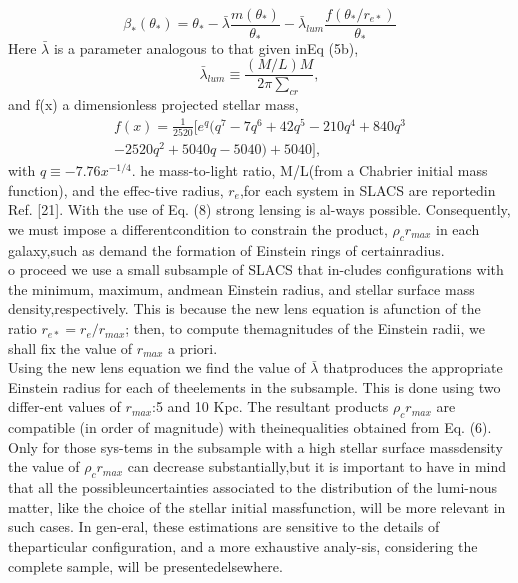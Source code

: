 \documentclass{article}\newcommand\Star[1]{#1\textsuperscript{*}}
\begin{document}
\begin{multicols}{2}
\begin{equation}\tag{8a}
	\beta_{*}(\theta_{*})=\theta_{*}-\bar{\lambda} \frac{m(\theta_{*})}{\theta_{*}}-\bar{\lambda}_{lum} \frac{f(\theta_{*}/r_{e*})}{\theta_{*}}
\end{equation}
 Here \(\bar\lambda\) is  a  parameter  analogous  to  that  given  inEq (5b),
\begin{equation}\tag{8b}
	\bar{\lambda}_{lum}\equiv \frac{(M/L)M}{2\pi\sum_{cr}}, 
\end{equation} 
and f(x) a dimensionless projected stellar mass,
\begin{multline*}\tag{8c}
	 f(x)=\frac{1}{2520}[e^{q}(q^{7}-7q^{6}+42q^{5}-210q^{4}+840q^{3} \\ -2520q^{2}+5040q-5040)+5040],
\end{multline*}
with \(q\equiv -7.76x^{-1/4}\). he  mass-to-light  ratio, M/L(from  a  Chabrier  initial  mass  function),  and  the  effec-tive radius, \(r_{e}\),for each system in SLACS are reportedin Ref. [21].  With the use of Eq.  (8) strong lensing is al-ways possible.  Consequently, we must impose a differentcondition to constrain the product, \(\rho_{c}r_{max}\) in each galaxy,such as demand the formation of Einstein rings of certainradius.\\
o proceed we use a small subsample of SLACS that in-cludes configurations with the minimum, maximum, andmean  Einstein  radius,  and  stellar  surface  mass  density,respectively.  This is because the new lens equation is afunction of the ratio \(r_{e*}=r_{e}/r_{max}\); then, to compute themagnitudes of the Einstein radii, we shall fix the value of \(r_{max}\) a priori. \\
Using the new lens equation we find the value of \(\bar{\lambda}\) thatproduces the appropriate Einstein radius for each of theelements in the subsample.  This is done using two differ-ent values of \(r_{max}\):5 and 10 Kpc.  The resultant products \(\rho_{c}r_{max}\) are compatible (in order of magnitude) with theinequalities obtained from Eq.  (6).  Only for those sys-tems in the subsample with a high stellar surface massdensity  the  value  of \(\rho_{c}r_{max}\) can  decrease  substantially,but it is important to have in mind that all the possibleuncertainties associated to the distribution of the lumi-nous  matter,  like  the  choice  of  the  stellar  initial  massfunction,  will  be  more  relevant  in  such  cases.   In  gen-eral, these estimations are sensitive to the details of theparticular  configuration,  and  a  more  exhaustive  analy-sis,  considering  the  complete  sample,  will  be  presentedelsewhere. \\
\end{multicols}
\end{document}
